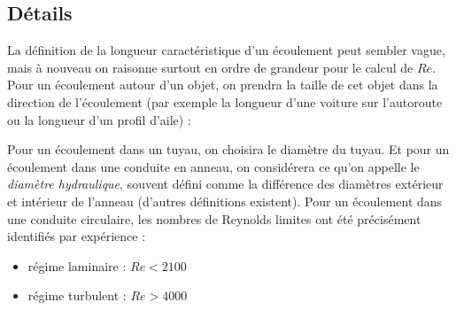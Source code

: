 \subsection{Détails}\label{sec:Re_details}
La définition de la longueur caractéristique d'un écoulement peut sembler vague, mais à nouveau on raisonne surtout en ordre de grandeur pour le calcul de $Re$. Pour un écoulement autour d'un objet, on prendra la taille de cet objet dans la direction de l'écoulement (par exemple la longueur d'une voiture sur l'autoroute ou la longueur d'un profil d'aile) :
%
\begin{center}
\end{center}
%
Pour un écoulement dans un tuyau, on choisira le diamètre du tuyau. Et pour un écoulement dans une conduite en anneau, on considérera ce qu'on appelle le \textit{diamètre hydraulique}, souvent défini comme la différence des diamètres extérieur et intérieur de l'anneau (d'autres définitions existent).
%
Pour un écoulement dans une conduite circulaire, les nombres de Reynolds limites ont été précisément identifiés par expérience :
\begin{itemize}\renewcommand{\labelitemi}{$\bullet$}
\item régime laminaire : $Re<2100$
\item régime turbulent : $Re>4000$
\end{itemize}